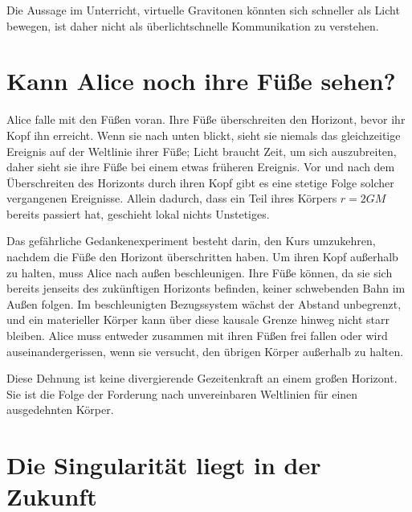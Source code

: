 Die Aussage im Unterricht, virtuelle Gravitonen könnten sich schneller als Licht bewegen, ist daher nicht als überlichtschnelle Kommunikation zu verstehen.

\section{Kann Alice noch ihre Füße sehen?}

Alice falle mit den Füßen voran. Ihre Füße überschreiten den Horizont, bevor ihr Kopf ihn erreicht. Wenn sie nach unten blickt, sieht sie niemals das gleichzeitige Ereignis auf der Weltlinie ihrer Füße; Licht braucht Zeit, um sich auszubreiten, daher sieht sie ihre Füße bei einem etwas früheren Ereignis. Vor und nach dem Überschreiten des Horizonts durch ihren Kopf gibt es eine stetige Folge solcher vergangenen Ereignisse. Allein dadurch, dass ein Teil ihres Körpers \(r=2GM\) bereits passiert hat, geschieht lokal nichts Unstetiges.

Das gefährliche Gedankenexperiment besteht darin, den Kurs umzukehren, nachdem die Füße den Horizont überschritten haben. Um ihren Kopf außerhalb zu halten, muss Alice nach außen beschleunigen. Ihre Füße können, da sie sich bereits jenseits des zukünftigen Horizonts befinden, keiner schwebenden Bahn im Außen folgen. Im beschleunigten Bezugssystem wächst der Abstand unbegrenzt, und ein materieller Körper kann über diese kausale Grenze hinweg nicht starr bleiben. Alice muss entweder zusammen mit ihren Füßen frei fallen oder wird auseinandergerissen, wenn sie versucht, den übrigen Körper außerhalb zu halten.

Diese Dehnung ist keine divergierende Gezeitenkraft an einem großen Horizont. Sie ist die Folge der Forderung nach unvereinbaren Weltlinien für einen ausgedehnten Körper.

\section{Die Singularität liegt in der Zukunft}

